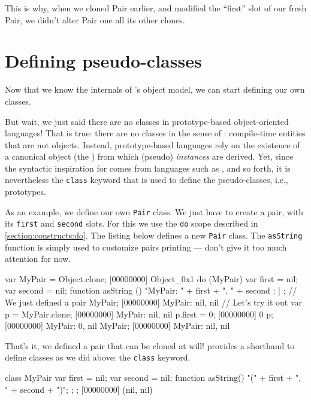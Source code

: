 This is why, when we cloned Pair earlier, and modified the ``first''
slot of our fresh Pair, we didn't alter Pair one all its other clones.

\section{Defining pseudo-classes}
\label{sec:tut:class}

Now that we know the internals of \us's object model, we can start
defining our own classes.

But wait, we just said there are no classes in prototype-based
object-oriented languages!  That is true: there are no classes in the
sense of \Cxx: compile-time entities that are not objects.  Instead,
prototype-based languages rely on the existence of a canonical object
(the ) from which (pseudo) \emph{instances} are
derived.  Yet, since the syntactic inspiration for \us comes from
languages such as \Java, \Cxx and so forth, it is nevertheless the
\lstinline|class| keyword that is used to define the pseudo-classes,
i.e., prototypes.

As an example, we define our own \lstinline{Pair} class. We just have
to create a pair, with its \lstinline|first| and \lstinline|second|
slots. For this we use the \lstinline{do} scope described in
\autoref{section:constructs:do}. The listing below defines a new
\lstinline{Pair} class. The \lstinline{asString} function is simply
used to customize pairs printing --- don't give it too much attention
for now.

\begin{urbiscript}[firstnumber=1]
var MyPair = Object.clone;
[00000000] Object_0x1
do (MyPair)
{
  var first = nil;
  var second = nil;
  function asString ()
  {
    "MyPair: " + first + ", " + second
  };
} | {};
// We just defined a pair
MyPair;
[00000000] MyPair: nil, nil
// Let's try it out
var p = MyPair.clone;
[00000000] MyPair: nil, nil
p.first = 0;
[00000000] 0
p;
[00000000] MyPair: 0, nil
MyPair;
[00000000] MyPair: nil, nil
\end{urbiscript}

That's it, we defined a pair that can be cloned at will! \us
provides a shorthand to define classes as we did above: the
\lstinline{class} keyword.

\begin{urbiscript}[firstnumber=1]
class MyPair
{
  var first = nil;
  var second = nil;
  function asString() { "(" + first + ", " + second + ")"; };
};
[00000000] (nil, nil)
\end{urbiscript}

